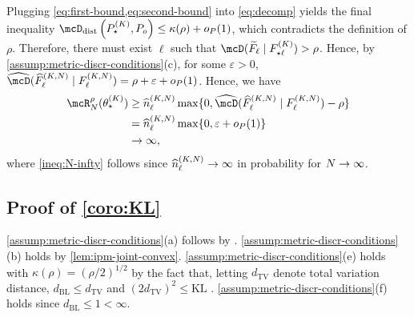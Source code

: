 Plugging \cref{eq:first-bound,eq:second-bound} into \cref{eq:decomp} yields the final inequality $\distDisc\left(P^{(\numcomps)}_{\star}, P_{o}\right) \le \kappa(\rho) + \op(1)$, which contradicts the 
definition of $\rho$.
Therefore, there must exist $\ell$ such that $\discr{\widetilde{F}_{\ell}}{F^{(\numcomps)}_{\star \ell}} > \rho$.
Hence, by \cref{assump:metric-discr-conditions}(c), for some $\varepsilon > 0$, $\discrest{\widehat{F}_{\ell}^{(\numcomps,\numobs)} }{F^{(\numcomps,\numobs)}_{\ell}} = \rho + \varepsilon +\op(1)$.
Hence, we have
\begin{align}
	\mcR^{\rho}_{\numobs}(\allparam^{(\numcomps)}_{\star})
	 & \ge \widehat{n}_{\ell}^{(\numcomps,\numobs)}\max\{0, \discrest{\widehat{F}_{\ell}^{(\numcomps,\numobs)} }{F^{(\numcomps,\numobs)}_{\ell}} - \rho\}                             \\
	 & = \widehat{n}_{\ell}^{(\numcomps,\numobs)}\max\{0, \varepsilon + \op(1)\}                                                                                                               \\
	 & \rightarrow \infty,\label{ineq:N-infty}
\end{align}
where \cref{ineq:N-infty} follows
since $\widehat{n}_{\ell}^{(K,N)}  \rightarrow \infty$ in probability for $N\rightarrow\infty$.


\subsection{Proof of \cref{coro:KL}}

 \cref{assump:metric-discr-conditions}(a) follows by \citet[Theorem 1]{Wellner:1981}.
 \cref{assump:metric-discr-conditions}(b) holds by \cref{lem:ipm-joint-convex}.
 \cref{assump:metric-discr-conditions}(e) holds with $\kappa(\rho) =(\rho/2)^{1/2}$ by the fact that, letting $d_{\mathrm{TV}}$
denote total variation distance, $d_{\mathrm{BL}} \le d_{\mathrm{TV}}$ and
$(2d_{\mathrm{TV}})^{2}  \le \mathrm{KL}$ \citep[][Section 3]{Gibbs:2002}.
 \cref{assump:metric-discr-conditions}(f) holds since $d_{\mathrm{BL}} \le 1 < \infty$.

